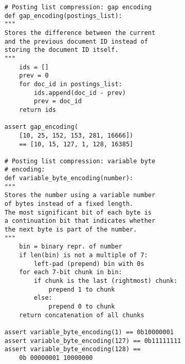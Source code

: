 \begin{lstlisting}
    # Posting list compression: gap encoding
    def gap_encoding(postings_list):
    """
    Stores the difference between the current
    and the previous document ID instead of
    storing the document ID itself.
    """
        ids = []
        prev = 0
        for doc_id in postings_list:
            ids.append(doc_id - prev)
            prev = doc_id
        return ids

    assert gap_encoding(
        [10, 25, 152, 153, 281, 16666])
        == [10, 15, 127, 1, 128, 16385]

    # Posting list compression: variable byte
    # encoding:
    def variable_byte_encoding(number):
    """
    Stores the number using a variable number
    of bytes instead of a fixed length.
    The most significant bit of each byte is
    a continuation bit that indicates whether
    the next byte is part of the number.
    """
        bin = binary repr. of number
        if len(bin) is not a multiple of 7:
            left-pad (prepend) bin with 0s
        for each 7-bit chunk in bin:
            if chunk is the last (rightmost) chunk:
                prepend 1 to chunk
            else:
                prepend 0 to chunk
        return concatenation of all chunks

    assert variable_byte_encoding(1) == 0b10000001
    assert variable_byte_encoding(127) == 0b11111111
    assert variable_byte_encoding(128) ==
        0b 00000001 10000000
\end{lstlisting}